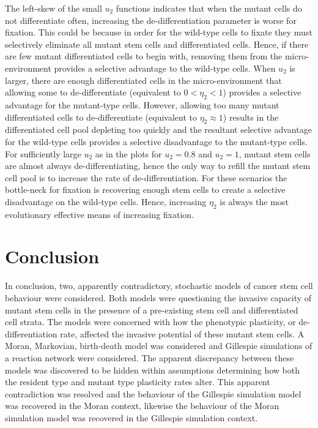 \documentclass[12pt]{article}
\begin{document}
The left-skew of the small $u_2$ functions indicates that when the mutant cells do not differentiate often, increasing the de-differentiation parameter is worse for fixation. This could be because in order for the wild-type cells to fixate they must selectively eliminate all mutant stem cells and differentiated cells. Hence, if there are few mutant differentiated cells to begin with, removing them from the micro-environment provides a selective advantage to the wild-type cells. When $u_2$ is larger, there are enough differentiated cells in the micro-environment that allowing some to de-differentiate (equivalent to $0<\eta_2<1$) provides a selective advantage for the mutant-type cells. However, allowing too many mutant differentiated cells to de-differentiate (equivalent to $\eta_2\approx 1$) results in the differentiated cell pool depleting too quickly and the resultant selective advantage for the wild-type cells provides a selective disadvantage to the mutant-type cells. For sufficiently large $u_2$ as in the plots for $u_2=0.8$ and $u_2=1$, mutant stem cells are almost always de-differentiating, hence the only way to refill the mutant stem cell pool is to increase the rate of de-differentiation. For these scenarios the bottle-neck for fixation is recovering enough stem cells to create a selective disadvantage on the wild-type cells. Hence, increasing $\eta_2$ is always the most evolutionary effective means of increasing fixation.

\section{Conclusion}
In conclusion, two, apparently contradictory, stochastic models of cancer stem cell behaviour were considered. Both models were questioning the invasive capacity of mutant stem cells in the presence of a pre-existing stem cell and differentiated cell strata. The models were concerned with how the phenotypic plasticity, or de-differentiation rate, affected the invasive potential of these mutant stem cells. A Moran, Markovian, birth-death model was considered and Gillespie simulations of a reaction network were considered. The apparent discrepancy between these models was discovered to be hidden within assumptions determining how both the resident type and mutant type plasticity rates alter. This apparent contradiction was resolved and the behaviour of the Gillespie simulation model was recovered in the Moran context, likewise the behaviour of the Moran simulation model was recovered in the Gillespie simulation context.
\end{document}
